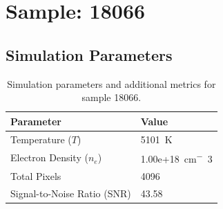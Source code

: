 \documentclass[a4paper,11pt]{article}
\begin{document}
\clearpage

\section{Sample: 18066}
\subsection{Simulation Parameters}
\begin{table}[h!]
    \centering
    \begin{tabular}{ll}
        \toprule
        \textbf{Parameter} & \textbf{Value} \\
        \midrule
        Temperature ($T$) & 5101 \,\si{K} \\
        Electron Density ($n_e$) & 1.00e+18 \,\si{cm^-3} \\
        Total Pixels & 4096 \\
        Signal-to-Noise Ratio (SNR) & 43.58 \\
        \bottomrule
    \end{tabular}
    \caption{Simulation parameters and additional metrics for sample 18066.}
    \label{tab:params_18066}
\end{table}
\end{document}
